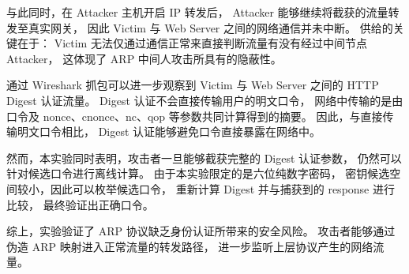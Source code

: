 与此同时，在 Attacker 主机开启 IP 转发后，
Attacker 能够继续将截获的流量转发至真实网关，
因此 Victim 与 Web Server 之间的网络通信并未中断。
供给的关键在于：
Victim 无法仅通过通信正常来直接判断流量有没有经过中间节点Attacker，
这体现了 ARP 中间人攻击所具有的隐蔽性。

通过 Wireshark 抓包可以进一步观察到 Victim 与 Web Server
之间的 HTTP Digest 认证流量。
Digest 认证不会直接传输用户的明文口令，
网络中传输的是由口令及 nonce、cnonce、nc、qop 等参数共同计算得到的摘要。
因此，与直接传输明文口令相比，
Digest 认证能够避免口令直接暴露在网络中。

然而，本实验同时表明，攻击者一旦能够截获完整的 Digest 认证参数，
仍然可以针对候选口令进行离线计算。
由于本实验限定的是六位纯数字密码，
密钥候选空间较小，因此可以枚举候选口令，
重新计算 Digest 并与捕获到的 response 进行比较，
最终验证出正确口令。

综上，实验验证了 ARP 协议缺乏身份认证所带来的安全风险。
攻击者能够通过伪造 ARP 映射进入正常流量的转发路径，
进一步监听上层协议产生的网络流量。

